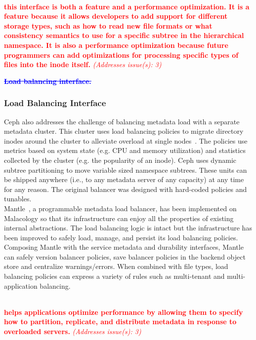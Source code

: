 \documentclass[preprint]{sigplanconf-eurosys}
\newcommand{\newcomment}[1]{{\textcolor{red}{\textbf{#1}}}}
\newcommand{\oldcomment}[1]{{\textcolor{blue}{\textbf{\sout{#1}}}}}
\newcommand{\addressesissue}[1]{{\textcolor{red}{{\it (Addresses issue(s): {#1})}}}}
\begin{document}
\newcomment{\\  this interface is both a feature
and a performance optimization. It is a feature because it allows developers to
add support for different  storage types, such as how to read new file formats
or what consistency semantics to use for a specific subtree in the hierarchical
namespace. It is also a performance optimization because future programmers can
add optimizations for processing specific types of files into the inode itself.}
\addressesissue{3}


\oldcomment{\noindent \bf Load balancing interface.} 
\subsubsection{Load Balancing Interface}

Ceph also addresses the challenge of balancing metadata load with a separate
metadata cluster. This cluster uses load balancing policies to migrate
directory inodes around the cluster to alleviate overload at single
nodes~\cite{weil:sc2004-dyn-metadata}. The policies use metrics based on system
state (e.g.  CPU and memory utilization) and statistics collected by the
cluster (e.g. the popularity of an inode). Ceph uses dynamic subtree
partitioning to move variable sized namespace subtrees. These units can be
shipped anywhere (i.e., to any metadata server of any capacity) at any time for
any reason. The original balancer was designed with hard-coded policies and
tunables.\\

Mantle~\cite{sevilla:sc15-mantle}, a programmable metadata load balancer, has
been implemented on Malacology so that its infrastructure can enjoy all the
properties of existing internal abstractions.  The load balancing logic is
intact but the infrastructure has been improved to safely load, manage, and
persist its load balancing policies.  Composing Mantle with the service
metadata and durability interfaces, Mantle can safely version balancer
policies, save balancer policies in the backend object store and centralize
warnings/errors. When combined with file types, load balancing policies can
express a variety of rules such as multi-tenant and multi-application
balancing.

\newcomment{\\  helps applications optimize
performance by allowing them to specify how to partition, replicate, and
distribute metadata in response to overloaded servers.}
\addressesissue{3}
\end{document}
